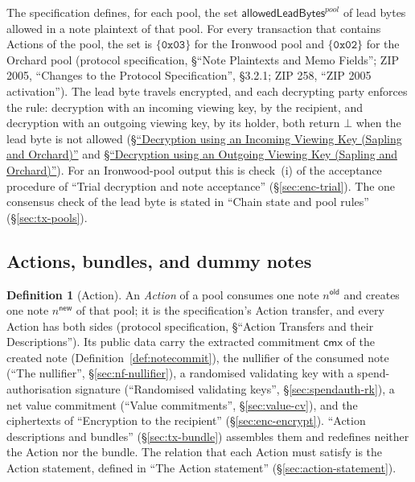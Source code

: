 \documentclass[11pt,a4paper]{article}
\theoremstyle{definition}
\newtheorem{definition}[theorem]{Definition}
\newcommand{\cmx}{\mathsf{cmx}}
\begin{document}
The specification defines, for each pool, the set
$\mathsf{allowedLeadBytes}^{\mathit{pool}}$ of lead bytes allowed in a note
plaintext of that pool. For every transaction that contains Actions of the
pool, the set is $\{\mathtt{0x03}\}$ for the Ironwood pool and
$\{\mathtt{0x02}\}$ for the Orchard pool (protocol specification, \S``Note
Plaintexts and Memo Fields''; ZIP 2005, ``Changes to the Protocol
Specification'', \S 3.2.1; ZIP 258, ``ZIP 2005 activation''). The lead byte
travels encrypted, and each decrypting party enforces the rule: decryption
with an incoming viewing key, by the recipient, and decryption with an
outgoing viewing key, by its holder, both return $\bot$ when the lead byte is
not allowed
(\href{https://zips.z.cash/protocol/protocol.pdf#decryptivk}%
{\S``Decryption using an Incoming Viewing Key (Sapling and Orchard)''} and
\href{https://zips.z.cash/protocol/protocol.pdf#decryptovk}%
{\S``Decryption using an Outgoing Viewing Key (Sapling and Orchard)''}).
For an Ironwood-pool output this is check~(i) of the acceptance
procedure of ``Trial decryption and note acceptance''
(\S\ref{sec:enc-trial}). The one consensus check of the lead byte is stated
in ``Chain state and pool rules'' (\S\ref{sec:tx-pools}).

\subsection{Actions, bundles, and dummy notes}\label{sec:notes-action}

\begin{definition}[Action]
An \emph{Action} of a pool consumes one note $n^{\mathsf{old}}$ and creates
one note $n^{\mathsf{new}}$ of that pool; it is the specification's Action
transfer, and every Action has both sides (protocol specification,
\S``Action Transfers and their Descriptions''). Its public data carry the
extracted commitment $\cmx$ of the created note
(Definition~\ref{def:notecommit}), the nullifier of the consumed note
(``The nullifier'', \S\ref{sec:nf-nullifier}), a randomised validating key
with a spend-authorisation signature (``Randomised validating keys'',
\S\ref{sec:spendauth-rk}), a net value commitment (``Value commitments'',
\S\ref{sec:value-cv}), and the ciphertexts of ``Encryption to the
recipient'' (\S\ref{sec:enc-encrypt}). ``Action descriptions and bundles''
(\S\ref{sec:tx-bundle}) assembles them and redefines neither the Action nor
the bundle. The relation that each Action must satisfy is the Action
statement, defined in ``The Action statement''
(\S\ref{sec:action-statement}).
\end{definition}
\end{document}
